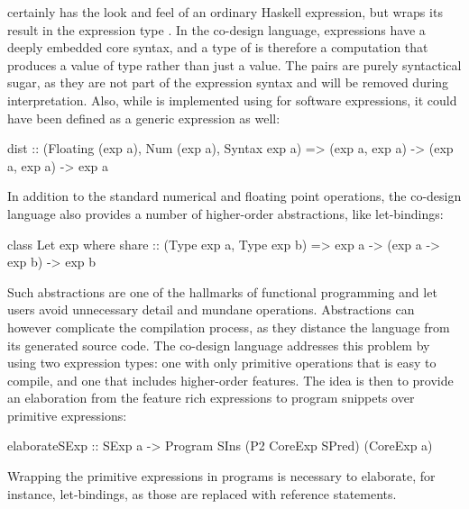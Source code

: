 \documentclass[../paper.tex]{subfiles}
\begin{document}
 certainly has the look and feel of an ordinary Haskell expression, but wraps its result  in the expression type . In the co-design language, expressions have a deeply embedded core syntax, and a type of  is therefore a computation that produces a value of type  rather than just a value. The pairs are purely syntactical sugar, as they are not part of the expression syntax and will be removed during interpretation. Also, while  is implemented using  for software expressions, it could have been defined as a generic expression as well:

\begin{code}
dist :: (Floating (exp a), Num (exp a), Syntax exp a) =>
        (exp a, exp a) -> (exp a, exp a) -> exp a
\end{code}

In addition to the standard numerical and floating point operations, the co-design language also provides a number of higher-order abstractions, like let-bindings:

\begin{code}
class Let exp where
  share :: (Type exp a, Type exp b) => exp a -> (exp a -> exp b) -> exp b
\end{code}

\noindent Such abstractions are one of the hallmarks of functional programming and let users avoid unnecessary detail and mundane operations. Abstractions can however complicate the compilation process, as they distance the language from its generated source code. The co-design language addresses this problem by using two expression types: one with only primitive operations that is easy to compile, and one that includes higher-order features. The idea is then to provide an elaboration from the feature rich expressions to program snippets over primitive expressions:


\begin{code}
elaborateSExp :: SExp a -> Program SIns (P2 CoreExp SPred) (CoreExp a)
\end{code}

\noindent Wrapping the primitive expressions in programs is necessary to elaborate, for instance, let-bindings, as those are replaced with reference statements.
\end{document}
